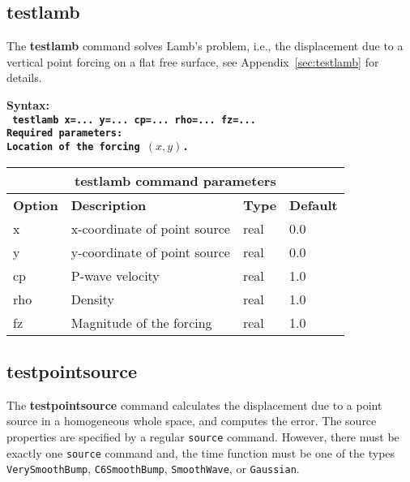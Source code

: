 \documentclass[11pt]{report}
\begin{document}
\subsection{testlamb}
\label{keyword:testlamb}
The {\bf testlamb} command solves Lamb's problem, i.e., the displacement due to a vertical point
forcing on a flat free surface, see Appendix~\ref{sec:testlamb} for details. 
\begin{flushleft}
\bf
Syntax:\\
\tt
testlamb x=... y=... cp=... rho=... fz=...
\\
\bf Required parameters:\\
\rm Location of the forcing $(x, y)$.
\end{flushleft}
%
\begin{center}
\begin{tabular}{|l|p{8cm}|l|l|} \hline
\multicolumn{4}{|c|}{\bf testlamb command  parameters}\\ \hline
\bf{Option} & \bf{Description} & \bf{Type} & \bf{Default} \\ \hline \hline
x    & x-coordinate of point source & real & 0.0 \\ \hline
y    & y-coordinate of point source & real & 0.0 \\ \hline
cp   & P-wave velocity              & real & 1.0 \\ \hline
rho  & Density                      & real & 1.0 \\ \hline
fz   & Magnitude of the forcing     & real & 1.0 \\ \hline
\end{tabular}
\end{center}

\subsection{testpointsource}
\label{keyword:pointsource}
The {\bf testpointsource} command calculates the displacement due to a point source in a homogeneous
whole space, and computes the error. The source properties are specified by a regular \verb+source+
command. However, there must be exactly one \verb+source+ command and, the time function must be
one of the types \verb+VerySmoothBump+, \verb+C6SmoothBump+, \verb+SmoothWave+, or \verb+Gaussian+.
\end{document}
